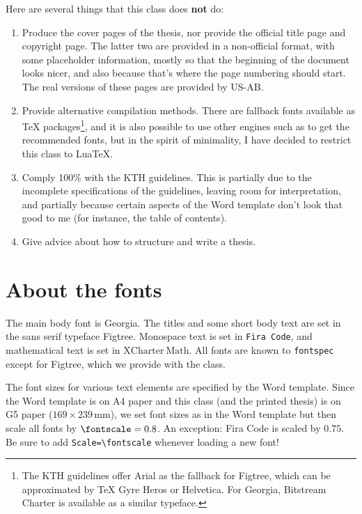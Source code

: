 \documentclass[figtreepath=kthpq/fonts/Figtree/]{kthpq-thesis}
\begin{document}
Here are several things that this class does \textbf{not} do:
\begin{enumerate}
\item
  Produce the cover pages of the thesis, nor provide the official title page and copyright page. The latter two are provided in a non-official format, with some placeholder information, mostly so that the beginning of the document looks nicer, and also because that's where the page numbering should start. The real versions of these pages are provided by US-AB.
\item
  Provide alternative compilation methods. There are fallback fonts available as \TeX{} packages\footnote{The KTH guidelines offer Arial as the fallback for Figtree, which can be approximated by \TeX{} Gyre Heros or Helvetica. For Georgia, Bitstream Charter is available as a similar typeface.}, and it is also possible to use other engines such as \XeTeX to get the recommended fonts, but in the spirit of minimality, I have decided to restrict this class to Lua\TeX.
\item
  Comply 100\% with the KTH guidelines. This is partially due to the incomplete specifications of the guidelines, leaving room for interpretation, and partially because certain aspects of the Word template don't look that good to me (for instance, the table of contents).
\item
  Give advice about how to structure and write a thesis.
\end{enumerate}

\section{About the fonts}

The main body font is Georgia. The titles and some short body text are set in the sans serif typeface \textsf{Figtree}. Monospace text is set in \texttt{Fira Code}, and mathematical text is set in $\mathrm{XCharter\ Math}$. All fonts are known to \texttt{fontspec} except for Figtree, which we provide with the class.

The font sizes for various text elements are specified by the Word template. Since the Word template is on A4 paper and this class (and the printed thesis) is on G5 paper ($169 \times 239\,\text{mm}$), we set font sizes as in the Word template but then scale all fonts by $\verb|\fontscale| = 0.8$. An exception: Fira Code is scaled by $0.75$. Be sure to add \verb|Scale=\fontscale| whenever loading a new font!
\end{document}
